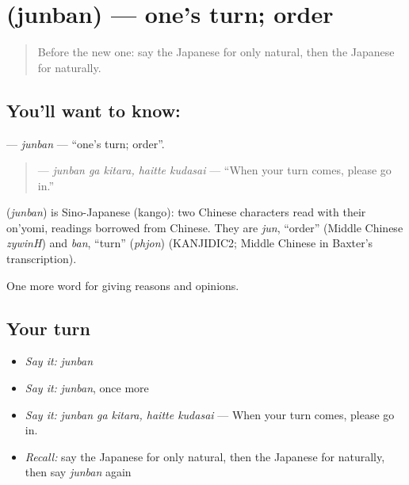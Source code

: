 \section[\texorpdfstring{\ja{じゅんばん} (junban)}{じゅんばん (junban)}]{ (junban) — one's turn; order}

\label{lesson:JA-C329-junban}



\begin{quote}
Before the new one: say the Japanese for only natural, then the Japanese for naturally.
\end{quote}

\subsection*{You'll want to know: }
\textbf{} — \emph{junban} — \textquotedblleft{}one's turn; order\textquotedblright{}.

\begin{quote}
\textbf{  } — \emph{junban ga kitara, haitte kudasai} — \textquotedblleft{}When your turn comes, please go in.\textquotedblright{}
\end{quote}

\begin{cousinweb}
\textbf{} (\emph{junban}) is Sino-Japanese (kango): two Chinese characters read with their on'yomi, readings borrowed from Chinese. They are \emph{jun}, \textquotedblleft{}order\textquotedblright{} (Middle Chinese \emph{zywinH}) and \emph{ban}, \textquotedblleft{}turn\textquotedblright{} (\emph{phjon}) (KANJIDIC2; Middle Chinese in Baxter's transcription).
\end{cousinweb}

\begin{grammarlens}[title={What you've built}]
One more word for giving reasons and opinions.
\end{grammarlens}

\subsection*{Your turn}
\begin{itemize}
\raggedright
  \item \emph{Say it:} \emph{junban}
  \item \emph{Say it:} \emph{junban}, once more
  \item \emph{Say it:} \emph{junban ga kitara, haitte kudasai} — When your turn comes, please go in.
  \item \emph{Recall:} say the Japanese for only natural, then the Japanese for naturally, then say \emph{junban} again
\end{itemize}


